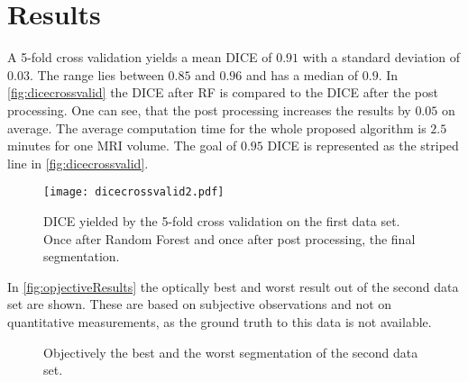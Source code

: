 \section{Results}
A 5-fold cross validation yields a mean DICE of $0.91$ with a standard deviation of $0.03$. The range lies between $0.85$ and $0.96$ and has a median of $0.9$. In \autoref{fig:dicecrossvalid} the DICE after RF is compared to the DICE after the post processing. One can see, that the post processing increases the results by $0.05$ on average. The average computation time for the whole proposed algorithm is $2.5$ minutes for one MRI volume. The goal of $0.95$ DICE is represented as the striped line in \autoref{fig:dicecrossvalid}.
\begin{figure}[h]
\centering
\texttt{[image: dicecrossvalid2.pdf]}
\caption{DICE yielded by the 5-fold cross validation on the first data set. Once after Random Forest and once after post processing, the final segmentation.}
\label{fig:dicecrossvalid}
\end{figure}

In \autoref{fig:opjectiveResults} the optically best and worst result out of the second data set are shown. These are based on subjective observations and not on quantitative measurements, as the ground truth to this data is not available.
\begin{figure*}[!t]
	\centering
	\hfil
	
	\caption{Objectively the best and the worst segmentation of the second data set.}
	\label{fig:opjectiveResults}
\end{figure*}